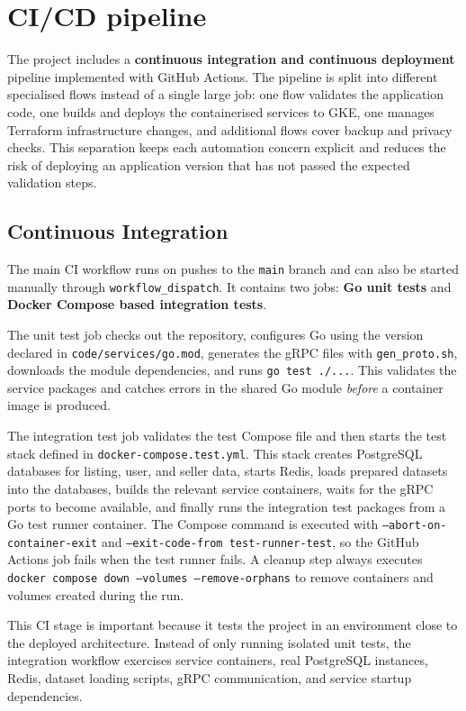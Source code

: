 \chapter{CI/CD pipeline} \label{cap:pipeline}

The project includes a \textbf{continuous integration and continuous deployment} pipeline implemented with GitHub Actions. The pipeline is split into different specialised flows instead of a single large job: one flow validates the application code, one builds and deploys the containerised services to GKE, one manages Terraform infrastructure changes, and additional flows cover backup and privacy checks. This separation keeps each automation concern explicit and reduces the risk of deploying an application version that has not passed the expected validation steps.

\section{Continuous Integration}

The main CI workflow runs on pushes to the \texttt{main} branch and can also be started manually through \texttt{workflow\_dispatch}. It contains two jobs: \textbf{Go unit tests} and \textbf{Docker Compose based integration tests}.

The unit test job checks out the repository, configures Go using the version declared in \texttt{code/services/go.mod}, generates the gRPC files with \texttt{gen\_proto.sh}, downloads the module dependencies, and runs \texttt{go test ./...}. This validates the service packages and catches errors in the shared Go module \textit{before} a container image is produced.

The integration test job validates the test Compose file and then starts the test stack defined in \texttt{docker-compose.test.yml}. This stack creates PostgreSQL databases for listing, user, and seller data, starts Redis, loads prepared datasets into the databases, builds the relevant service containers, waits for the gRPC ports to become available, and finally runs the integration test packages from a Go test runner container. The Compose command is executed with \texttt{--abort-on-container-exit} and \texttt{--exit-code-from test-runner-test}, so the GitHub Actions job fails when the test runner fails. A cleanup step always executes \texttt{docker compose down --volumes --remove-orphans} to remove containers and volumes created during the run.

This CI stage is important because it tests the project in an environment close to the deployed architecture. Instead of only running isolated unit tests, the integration workflow exercises service containers, real PostgreSQL instances, Redis, dataset loading scripts, gRPC communication, and service startup dependencies.


